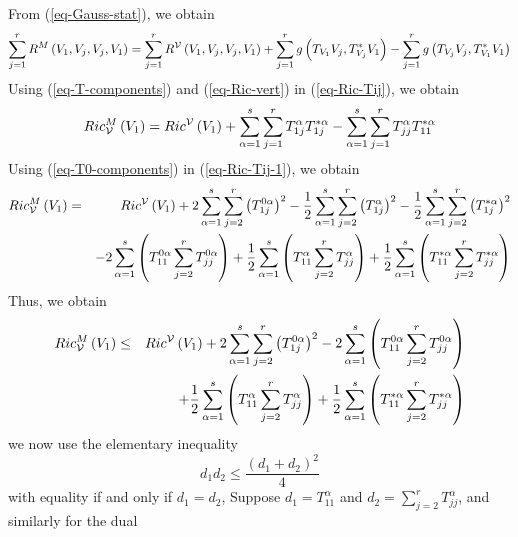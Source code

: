 \documentclass[10pt,a4paper]{article}
\theoremstyle{definition}
\theoremstyle{remark}
\numberwithin{equation}{section}
\begin{document}
 From (\ref{eq-Gauss-stat}), we obtain%
\begin{equation}
\sum_{j=1}^{r}R^{M}\left( V_{1},V_{j},V_{j},V_{1}\right) =\sum_{j=1}^{r}R^{%
{\cal V}}\left( V_{1},V_{j},V_{j},V_{1}\right) +\sum_{j=1}^{r}g\left(
T_{V_{1}}V_{j},T_{V_{j}}^{\ast }V_{1}\right) -\sum_{j=1}^{r}g\left(
T_{V_{j}}V_{j},T_{V_{1}}^{\ast }V_{1}\right)  \label{eq-Ric-Tij}
\end{equation}%
Using (\ref{eq-T-components}) and (\ref{eq-Ric-vert}) in (\ref{eq-Ric-Tij}), we obtain%
\begin{equation}
Ric_{{\cal V}}^{M}\left( V_{1}\right) =Ric^{{\cal V}}\left( V_{1}\right)
+\sum_{\alpha =1}^{s}\sum_{j=1}^{r}T_{1j}^{\alpha }T_{1j}^{\ast \alpha
}-\sum_{\alpha =1}^{s}\sum_{j=1}^{r}T_{jj}^{\alpha }T_{11}^{\ast \alpha }
\label{eq-Ric-Tij-1}
\end{equation}%
Using (\ref{eq-T0-components}) in (\ref{eq-Ric-Tij-1}), we obtain%
\begin{eqnarray}
Ric_{{\cal V}}^{M}\left( V_{1}\right) &=&Ric^{{\cal V}}\left( V_{1}\right)
+2\sum_{\alpha =1}^{s}\sum_{j=2}^{r}\left( T_{1j}^{0\alpha }\right) ^{2}-%
\frac{1}{2}\sum_{\alpha =1}^{s}\sum_{j=2}^{r}\left( T_{1j}^{\alpha }\right)
^{2}-\frac{1}{2}\sum_{\alpha =1}^{s}\sum_{j=2}^{r}\left( T_{1j}^{\ast \alpha
}\right) ^{2}  \nonumber \\
&&-2\sum_{\alpha =1}^{s}\left( T_{11}^{0\alpha
}\sum_{j=2}^{r}T_{jj}^{0\alpha }\right) +\frac{1}{2}\sum_{\alpha
=1}^{s}\left( T_{11}^{\alpha }\sum_{j=2}^{r}T_{jj}^{\alpha }\right) +\frac{1%
}{2}\sum_{\alpha =1}^{s}\left( T_{11}^{\ast \alpha
}\sum_{j=2}^{r}T_{jj}^{\ast \alpha }\right)  \label{eq-abc}
\end{eqnarray}%
Thus, we obtain%
\begin{eqnarray}
Ric_{{\cal V}}^{M}\left( V_{1}\right) &\leq &Ric^{{\cal V}}\left(
V_{1}\right) +2\sum_{\alpha =1}^{s}\sum_{j=2}^{r}\left( T_{1j}^{0\alpha
}\right) ^{2}-2\sum_{\alpha =1}^{s}\left( T_{11}^{0\alpha
}\sum_{j=2}^{r}T_{jj}^{0\alpha }\right)  \nonumber \\
&&+\frac{1}{2}\sum_{\alpha =1}^{s}\left( T_{11}^{\alpha
}\sum_{j=2}^{r}T_{jj}^{\alpha }\right) +\frac{1}{2}\sum_{\alpha
=1}^{s}\left( T_{11}^{\ast \alpha }\sum_{j=2}^{r}T_{jj}^{\ast \alpha }\right)
\label{eq-CR-ineq}
\end{eqnarray}%
we now use the elementary inequality%
\[
d_{1}d_{2}\leq \frac{\left( d_{1}+d_{2}\right) ^{2}}{4} 
\]%
with equality if and only if $d_{1}=d_{2}$, Suppose $d_{1}=T_{11}^{\alpha }$
and $d_{2}=\sum_{j=2}^{r}T_{jj}^{\alpha }$, and similarly for the dual
\end{document}
